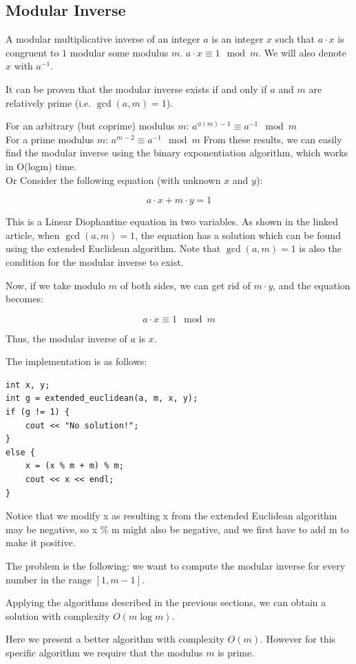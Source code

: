 \documentclass[8pt, a4paper, oneside, twocolumn]{extarticle}
\begin{document}
\subsection{Modular Inverse}
A modular multiplicative inverse of an integer $a$ is an integer $x$ such that $a \cdot x$ is congruent to $1$ modular some modulus $m$. $a \cdot x \equiv 1 \mod m.$ We will also denote $x$ with $a^{-1}$.

It can be proven that the modular inverse exists if and only if $a$ and $m$ are relatively prime (i.e. $\gcd(a, m) = 1$).

For an arbitrary (but coprime) modulus $m$: $a ^ {\phi (m) - 1} \equiv a ^{-1} \mod m$\\
For a prime modulus $m$: $a ^ {m - 2} \equiv a ^ {-1} \mod m$
From these results, we can easily find the modular inverse using the binary exponentiation algorithm, which works in O(logm) time.
\\Or
Consider the following equation (with unknown $x$ and $y$):

$$a \cdot x + m \cdot y = 1$$

This is a Linear Diophantine equation in two variables. As shown in the linked article, when $\gcd(a, m) = 1$, the equation has a solution which can be found using the extended Euclidean algorithm. Note that $\gcd(a, m) = 1$ is also the condition for the modular inverse to exist.

Now, if we take modulo $m$ of both sides, we can get rid of $m \cdot y$, and the equation becomes:

$$a \cdot x \equiv 1 \mod m$$

Thus, the modular inverse of $a$ is $x$.

The implementation is as follows:
\begin{verbatim}
int x, y;
int g = extended_euclidean(a, m, x, y);
if (g != 1) {
    cout << "No solution!";
}
else {
    x = (x % m + m) % m;
    cout << x << endl;
}
\end{verbatim}
Notice that we modify x as resulting x from the extended Euclidean algorithm may be negative, so x \% m might also be negative, and we first have to add m to make it positive.

The problem is the following: we want to compute the modular inverse for every number in the range $[1, m-1]$.

Applying the algorithms described in the previous sections, we can obtain a solution with complexity $O(m \log m)$.

Here we present a better algorithm with complexity $O(m)$. However for this specific algorithm we require that the modulus $m$ is prime.
\end{document}
